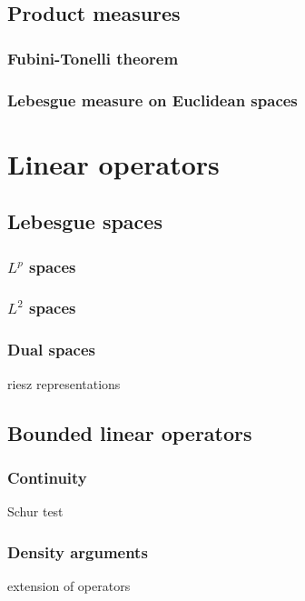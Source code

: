 \documentclass{../note}
\begin{document}
\chapter{Product measures}
\section{Fubini-Tonelli theorem}
\section{Lebesgue measure on Euclidean spaces}







\part{Linear operators}



\chapter{Lebesgue spaces}
\section{$L^p$ spaces}
\section{$L^2$ spaces}
\section{Dual spaces}
riesz representations








\chapter{Bounded linear operators}
\section{Continuity}
Schur test

\section{Density arguments}
extension of operators
\end{document}
